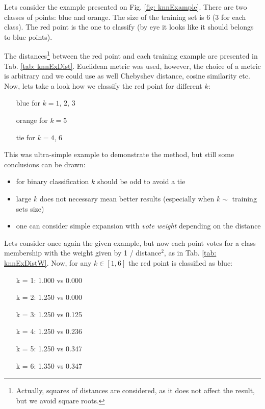 Lets consider the example presented on Fig. \ref{fig: knnExample}. There are two classes of points: blue and orange. The size of the training set is 6 (3 for each class). The red point is the one to classify (by eye it looks like it should belongs to blue points).

The distances\footnote{Actually, squares of distances are considered, as it does not affect the result, but we avoid square roots.} between the red point and each training example are presented in Tab. \ref{tab: knnExDist}. Euclidean metric was used, however, the choice of a metric is arbitrary and we could use as well Chebyshev distance, cosine similarity etc. Now, lets take a look how we classify the red point for different $k$:

\begin{itemize}
 \item[\color{blue}blue] for $k = 1$, $2$, $3$
 \item[\color{orange}orange] for $k = 5$
 \item[\color{red}tie] for $k = 4$, $6$
\end{itemize}

This was ultra-simple example to demonstrate the method, but still some conclusions can be drawn:

\begin{itemize}
  \item for binary classification $k$ should be odd to avoid a tie
  \item large $k$ does not necessary mean better results (especially when $k \sim$ training sets size)
  \item one can consider simple expansion with {\it vote weight} depending on the distance
\end{itemize}

Lets consider once again the given example, but now each point votes for a class membership with the weight given by 1 / distance$^2$, as in Tab. \ref{tab: knnExDistW}. Now, for any $k \in [1,6]$ the red point is classified as blue:

\begin{itemize}
 \item[k = 1:] {\color{blue}1.000} vs {\color{orange}0.000} 
 \item[k = 2:] {\color{blue}1.250} vs {\color{orange}0.000} 
 \item[k = 3:] {\color{blue}1.250} vs {\color{orange}0.125} 
 \item[k = 4:] {\color{blue}1.250} vs {\color{orange}0.236} 
 \item[k = 5:] {\color{blue}1.250} vs {\color{orange}0.347} 
 \item[k = 6:] {\color{blue}1.350} vs {\color{orange}0.347} 
\end{itemize}


